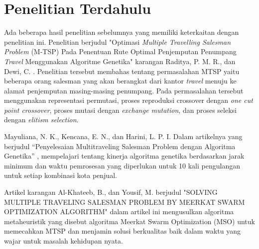 \section{Penelitian Terdahulu}

Ada beberapa hasil penelitian sebelumnya yang memiliki keterkaitan dengan penelitian ini. Penelitian berjudul "Optimasi \textit{Multiple Travelling Salesman Problem} (M-TSP) Pada Penentuan Rute Optimal Penjemputan Penumpang \textit{Travel} Menggunakan Algoritme Genetika" karangan Raditya, P. M. R., dan Dewi, C. \cite{raditya2017optimasi}. Penelitian tersebut membahas tentang permasalahan MTSP yaitu beberapa orang salesman yang akan berangkat dari kantor \textit{travel} menuju ke alamat penjemputan masing-masing penumpang. Pada permasalahan tersebut menggunakan representasi permutasi, proses reproduksi crossover dengan \textit{one cut point crossover}, proses mutasi dengan \textit{exchange mutation}, dan proses seleksi dengan \textit{elitism selection}.

Mayuliana, N. K., Kencana, E. N., dan Harini, L. P. I. Dalam artikelnya yang berjudul “Penyelesaian Multitraveling Salesman Problem dengan Algoritma Genetika” \cite{mayuliana2015penyelesaian}, mempelajari tentang kinerja algoritma genetika berdasarkan jarak minimum dan waktu pemrosesan yang diperlukan untuk 10 kali pengulangan untuk setiap kombinasi kota penjual.

Artikel karangan Al-Khateeb, B., dan Yousif, M. berjudul "SOLVING MULTIPLE TRAVELING SALESMAN PROBLEM BY MEERKAT SWARM OPTIMIZATION ALGORITHM" \cite{al2019solving} dalam artikel ini mengusulkan algoritma metaheuristik yang disebut algoritma Meerkat Swarm Optimization (MSO) untuk memecahkan MTSP dan menjamin solusi berkualitas baik dalam waktu yang wajar untuk masalah kehidupan nyata.
